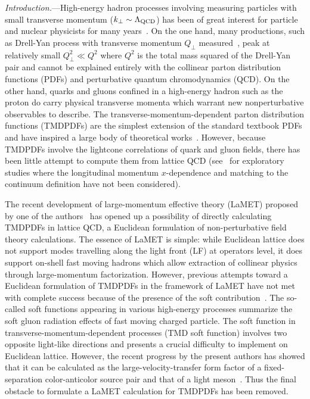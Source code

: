 \documentclass[twocolumn,aps,prd,preprintnumbers,superscriptaddress,10pt]{revtex4-1}
\begin{document}
{\it Introduction.}---High-energy hadron processes involving measuring particles with small transverse momentum ($k_\perp\sim \Lambda_{\rm QCD}$) has been of great interest for particle and nuclear physicists for many years~\cite{Collins:1981uk,Collins:1984kg}.
%
On the one hand, many productions, such as Drell-Yan process with
transverse momentum $Q_\perp$ measured~\cite{Bacchetta:2019sam,Scimemi:2019cmh}, peak at relatively small $Q_\perp^2\ll Q^2$
where $Q^2$ is the total mass squared of the Drell-Yan pair and cannot be explained entirely with the collinear parton distribution functions (PDFs) and perturbative quantum chromodynamics (QCD).
%
On the other hand, quarks and gluons confined in a high-energy hadron such as the proton do carry physical transverse momenta which warrant new nonperturbative observables to describe.
%
The transverse-momentum-dependent parton distribution functions (TMDPDFs) are the simplest extension of the standard textbook PDFs and have inspired a large body of theoretical works~\cite{Collins:1981uk,Collins:1984kg,Collins:1988ig,Ji:2004wu,Ji:2004xq,Collins:2011ca,Collins:2012uy,Becher:2010tm,GarciaEchevarria:2011rb,Echevarria:2012js,Chiu:2012ir}.
%
However, because TMDPDFs involve the lightcone correlations of quark and gluon fields, there has been little attempt to compute them from lattice QCD (see~\cite{Hagler:2009mb,Musch:2010ka,Musch:2011er,Engelhardt:2015xja,Yoon:2017qzo}
for exploratory studies where the longitudinal momentum $x$-dependence and matching to the continuum definition have not been considered).


The recent development of large-momentum effective theory (LaMET) proposed by one of the authors~\cite{Ji:2013dva,Ji:2014gla} has opened up a possibility of directly calculating TMDPDFs in lattice QCD, a Euclidean formulation of non-perturbative field theory calculations.
%
The essence of LaMET is simple: while Euclidean lattice does not support modes travelling along the light front (LF) at operators level, it does support on-shell fast moving hadrons which allow extraction of collinear physics
through large-momentum factorization.
%
However, previous attempts toward a Euclidean formulation of TMDPDFs in the framework of LaMET have not met with complete success because of the presence of the soft contribution~\cite{Ji:2014hxa,Ji:2018hvs,Ebert:2018gzl,Ebert:2019okf}.
%
The so-called soft functions appearing in various high-energy processes summarize the soft gluon radiation effects of fast moving charged particle.
%
The soft function in transverse-momentum-dependent processes (TMD soft function) involves two opposite light-like directions and presents a crucial difficulty to implement on Euclidean lattice.
%
However, the recent progress by the present authors has showed that it can be calculated as the large-velocity-transfer form factor of a fixed-separation color-anticolor source pair and that of a light meson~\cite{Ji:2019sxk}.
%
Thus the final obstacle to formulate a LaMET calculation for TMDPDFs has been removed.
\end{document}
